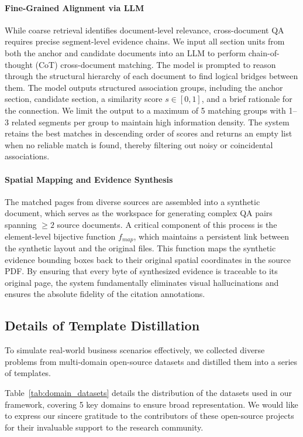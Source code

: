 \documentclass[]{opendatalab}
\begin{document}
{{{\paragraph{Fine-Grained Alignment via LLM}
While coarse retrieval identifies document-level relevance, cross-document QA requires precise segment-level evidence chains. We input all section units from both the anchor and candidate documents into an LLM to perform chain-of-thought (CoT) cross-document matching. The model is prompted to reason through the structural hierarchy of each document to find logical bridges between them. The model outputs structured association groups, including the anchor section, candidate section, a similarity score $s \in [0,1]$, and a brief rationale for the connection. We limit the output to a maximum of 5 matching groups with 1--3 related segments per group to maintain high information density. The system retains the best matches in descending order of scores and returns an empty list when no reliable match is found, thereby filtering out noisy or coincidental associations.

\paragraph{Spatial Mapping and Evidence Synthesis}
The matched pages from diverse sources are assembled into a synthetic document, which serves as the workspace for generating complex QA pairs spanning $\ge 2$ source documents. A critical component of this process is the element-level bijective function $f_{map}$, which maintains a persistent link between the synthetic layout and the original files. This function maps the synthetic evidence bounding boxes back to their original spatial coordinates in the source PDF. By ensuring that every byte of synthesized evidence is traceable to its original page, the system fundamentally eliminates visual hallucinations and ensures the absolute fidelity of the citation annotations.

\subsection{Details of Template Distillation}
\label{Appendix: Details of QA Construction}

To simulate real-world business scenarios effectively, we collected diverse problems from multi-domain open-source datasets and distilled them into a series of templates.

Table~\ref{tab:domain_datasets} details the distribution of the datasets used in our framework, covering 5 key domains to ensure broad representation. We would like to express our sincere gratitude to the contributors of these open-source projects for their invaluable support to the research community.

}}}
\end{document}
